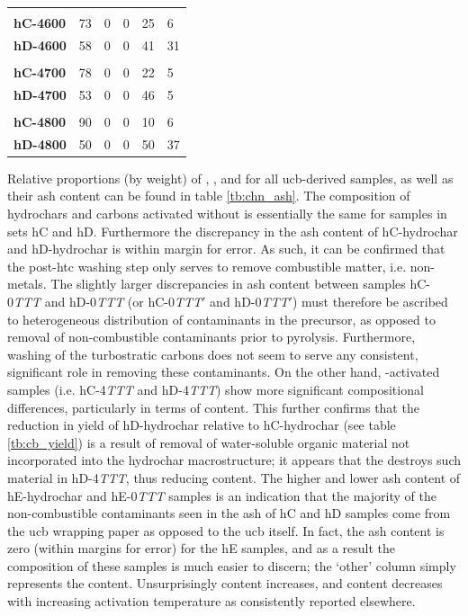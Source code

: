 \begin{table}[t!]
\begin{tabularx}{\textwidth}{lXXXX|X}
        &&&&&\\
        \textbf{hC-4600} & 73 & 0 & 0 & 25 & 6 \\
        \textbf{hD-4600} & 58 & 0 & 0 & 41 & 31 \\
        &&&&&\\
        \textbf{hC-4700} & 78 & 0 & 0 & 22 & 5 \\
        \textbf{hD-4700} & 53 & 0 & 0 & 46 & 5 \\
        &&&&&\\
        \textbf{hC-4800} & 90 & 0 & 0 & 10 & 6 \\
        \textbf{hD-4800} & 50 & 0 & 0 & 50 & 37 \\
    \bottomrule
    \end{tabularx}
\end{table}

Relative proportions (by weight) of , , and  for all \acrshort{ucb}-derived samples, as well as their \gls{ash content} can be found in table \ref{tb:chn_ash}. The composition of \glspl{hydrochar} and carbons activated without  is essentially the same for samples in sets hC and hD. Furthermore the discrepancy in the \gls{ash content} of hC-hydrochar and hD-hydrochar is within margin for error. As such, it can be confirmed that the post-\gls{htc} washing step only serves to remove combustible matter, i.e. non-metals. The slightly larger discrepancies in \gls{ash content} between samples hC-0\textit{TTT} and hD-0\textit{TTT} (or hC-0\textit{TTT}$'$ and hD-0\textit{TTT}$'$) must therefore be ascribed to heterogeneous distribution of contaminants in the precursor, as opposed to removal of non-combustible contaminants prior to pyrolysis. Furthermore, washing of the \glspl{turbostratic carbon} does not seem to serve any consistent, significant role  in removing these contaminants. On the other hand, -activated samples (i.e. hC-4\textit{TTT} and hD-4\textit{TTT}) show more significant compositional differences, particularly in terms of  content. This further confirms that the reduction in yield of hD-hydrochar relative to hC-hydrochar (see table \ref{tb:cb_yield}) is a result of removal of water-soluble organic material not incorporated into the \gls{hydrochar} macrostructure; it appears that the  destroys such material in hD-4\textit{TTT}, thus reducing  content. The higher  and lower \gls{ash content} of hE-hydrochar and hE-0\textit{TTT} samples is an indication that the majority of the non-combustible contaminants seen in the ash of hC and hD samples come from the \acrshort{ucb} wrapping paper as opposed to the \acrshort{ucb} itself. In fact, the \gls{ash content} is zero (within margins for error) for the hE samples, and as a result the composition of these samples is much easier to discern; the `other' column simply represents the  content. Unsurprisingly  content increases, and  content decreases with increasing activation temperature as consistently reported elsewhere.\citep{Blankenship2022Modulating, Sevilla2014Energy}

